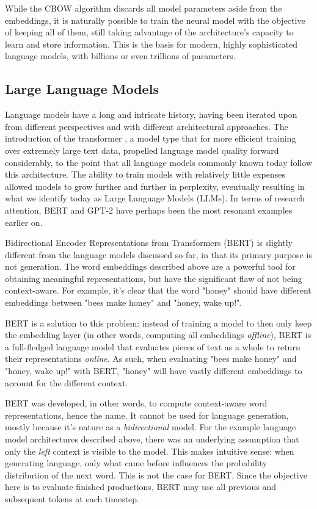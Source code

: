 While the CBOW algorithm discards all model parameters aside from the embeddings, it is naturally possible to train the neural model with the objective of keeping all of them, still taking advantage of the architecture's capacity to learn and store information. This is the basis for modern, highly sophisticated language models, with billions or even trillions of parameters.

\subsection{Large Language Models}

Language models have a long and intricate history, having been iterated upon from different perspectives and with different architectural approaches.
The introduction of the transformer \citep{vaswani2023attentionneed}, a model type that for more efficient training over extremely large text data, propelled language model quality forward considerably, to the point that all language models commonly known today follow this architecture.
The ability to train models with relatively little expenses allowed models to grow further and further in perplexity, eventually resulting in what we identify today as Large Language Models (LLMs).
In terms of research attention, BERT \citep{devlin2019bertpretrainingdeepbidirectional} and GPT-2 \citep{radford2019language} have perhaps been the most resonant examples earlier on.

Bidirectional Encoder Representations from Transformers (BERT) is slightly different from the language models discussed so far, in that its primary purpose is not generation.
The word embeddings described above are a powerful tool for obtaining meaningful representations, but have the significant flaw of not being context-aware.
For example, it's clear that the word "honey" should have different embeddings between "bees make honey" and "honey, wake up!".

BERT is a solution to this problem: instead of training a model to then only keep the embedding layer (in other words, computing all embeddings \emph{offline}), BERT is a full-fledged language model that evaluates pieces of text as a whole to return their representations \emph{online}.
As such, when evaluating "bees make honey" and "honey, wake up!" with BERT, "honey" will have vastly different embeddings to account for the different context.

BERT was developed, in other words, to compute context-aware word representations, hence the name. It cannot be used for language generation, mostly because it's nature as a \emph{bidirectional} model.
For the example language model architectures described above, there was an underlying assumption that only the \emph{left} context is visible to the model. This makes intuitive sense: when generating language, only what came before influences the probability distribution of the next word.
This is not the case for BERT. Since the objective here is to evaluate finished productions, BERT may use all previous and subsequent tokens at each timestep.

